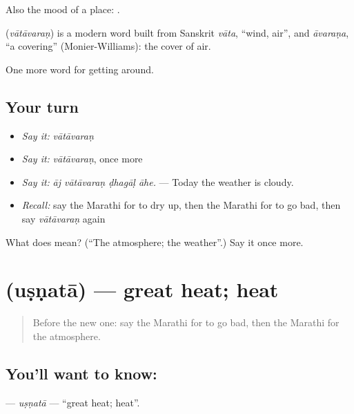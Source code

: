 Also the mood of a place:    .

\begin{cousinweb}
\textbf{} (\emph{vātāvaraṇ}) is a modern word built from Sanskrit \emph{vāta}, \textquotedblleft{}wind, air\textquotedblright{}, and \emph{āvaraṇa}, \textquotedblleft{}a covering\textquotedblright{} (Monier-Williams): the cover of air.
\end{cousinweb}

\begin{grammarlens}[title={What you've built}]
One more word for getting around.
\end{grammarlens}

\subsection*{Your turn}
\begin{itemize}
\raggedright
  \item \emph{Say it:} \emph{vātāvaraṇ}
  \item \emph{Say it:} \emph{vātāvaraṇ}, once more
  \item \emph{Say it:} \emph{āj vātāvaraṇ ḍhagāḷ āhe.} — Today the weather is cloudy.
  \item \emph{Recall:} say the Marathi for to dry up, then the Marathi for to go bad, then say \emph{vātāvaraṇ} again
\end{itemize}

\begin{tcolorbox}[breakable,colback=teal!4,colframe=teal!35!black,title={Before you move on}]
What does  mean? (\textquotedblleft{}The atmosphere; the weather\textquotedblright{}.) Say it once more.
\end{tcolorbox}
\section[\texorpdfstring{\mr{उष्णता} (uṣṇatā)}{उष्णता (uṣṇatā)}]{ (uṣṇatā) — great heat; heat}

\label{lesson:MR-C436-usnata}



\begin{quote}
Before the new one: say the Marathi for to go bad, then the Marathi for the atmosphere.
\end{quote}

\subsection*{You'll want to know: }
\textbf{} — \emph{uṣṇatā} — \textquotedblleft{}great heat; heat\textquotedblright{}.

